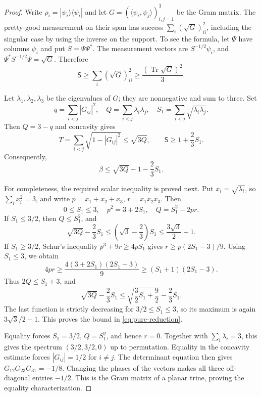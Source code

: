 \documentclass[a4paper,11pt,onecolumn,unpublished]{quantumarticle}
\theoremstyle{definition}
\newcommand{\Tr}{\operatorname{Tr}}
\newcommand{\1}{\mathbf 1}
\newcommand{\Sopt}{\mathsf S}
\begin{document}
\begin{proof}
Write $\rho_i=|\psi_i\rangle\langle\psi_i|$ and let
$G=(\langle\psi_i,\psi_j\rangle)_{i,j=1}^3$ be the Gram matrix.
The pretty-good measurement on their span has success
$\sum_i(\sqrt G)_{ii}^2$, including the singular case by using the inverse on
the support. To see the formula, let $\Psi$ have columns $\psi_i$ and put
$S=\Psi\Psi^*$. The measurement vectors are $S^{-1/2}\psi_i$, and
$\Psi^*S^{-1/2}\Psi=\sqrt G$. Therefore
\begin{equation}\label{eq:pure-PGM}
 \Sopt\ge\sum_i(\sqrt G)_{ii}^2\ge\frac{(\Tr\sqrt G)^2}{3}.
\end{equation}

Let $\lambda_1,\lambda_2,\lambda_3$ be the eigenvalues of $G$; they are
nonnegative and sum to three. Set
\[
 q=\sum_{i<j}|G_{ij}|^2,
 \quad Q=\sum_{i<j}\lambda_i\lambda_j,
 \quad S_1=\sum_{i<j}\sqrt{\lambda_i\lambda_j}.
\]
Then $Q=3-q$ and concavity gives
\[
 T=\sum_{i<j}\sqrt{1-|G_{ij}|^2}\le\sqrt{3Q},\qquad
 \Sopt\ge1+\frac23S_1.
\]
Consequently,
\begin{equation}\label{eq:pure-reduction}
 \beta\le\sqrt{3Q}-1-\frac23S_1.
\end{equation}

For completeness, the required scalar inequality is proved next. Put
$x_i=\sqrt{\lambda_i}$, so $\sum_i x_i^2=3$, and write
$p=x_1+x_2+x_3$, $r=x_1x_2x_3$. Then
\[
 0\le S_1\le3,\quad p^2=3+2S_1,\quad Q=S_1^2-2pr.
\]
If $S_1\le3/2$, then $Q\le S_1^2$, and
\[
 \sqrt{3Q}-\frac23S_1
 \le\left(\sqrt3-\frac23\right)S_1
 \le\frac{3\sqrt3}{2}-1.
\]
If $S_1\ge3/2$, Schur's inequality $p^3+9r\ge4pS_1$ gives
$r\ge p(2S_1-3)/9$. Using $S_1\le3$, we obtain
\[
 4pr\ge\frac{4(3+2S_1)(2S_1-3)}9
 \ge(S_1+1)(2S_1-3).
\]
Thus $2Q\le S_1+3$, and
\[
 \sqrt{3Q}-\frac23S_1
 \le\sqrt{\frac32S_1+\frac92}-\frac23S_1.
\]
The last function is strictly decreasing for $3/2\le S_1\le3$, so its maximum
is again $3\sqrt3/2-1$. This proves the bound in
\eqref{eq:pure-reduction}.

Equality forces $S_1=3/2$, $Q=S_1^2$, and hence $r=0$. Together with
$\sum_i\lambda_i=3$, this gives the spectrum $(3/2,3/2,0)$ up to permutation.
Equality in the concavity estimate forces $|G_{ij}|=1/2$ for $i\ne j$.
The determinant equation then gives
$G_{12}G_{23}G_{31}=-1/8$. Changing the phases of the vectors makes all three
off-diagonal entries $-1/2$. This is the Gram matrix of a planar trine,
proving the equality characterization.
\end{proof}
\end{document}
